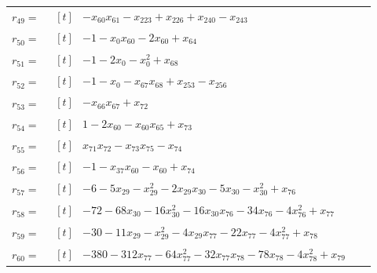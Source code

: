 \begin{longtable}{@{}r p{0.92\linewidth}@{}}
$r_{49}=$ & $\begin{aligned}[t]&-x_{60}x_{61}-x_{223}+x_{226}+x_{240}-x_{243}\end{aligned}$ \\[2pt]
$r_{50}=$ & $\begin{aligned}[t]&-1-x_{0}x_{60}-2x_{60}+x_{64}\end{aligned}$ \\[2pt]
$r_{51}=$ & $\begin{aligned}[t]&-1-2x_{0}-x_{0}^{2}+x_{68}\end{aligned}$ \\[2pt]
$r_{52}=$ & $\begin{aligned}[t]&-1-x_{0}-x_{67}x_{68}+x_{253}-x_{256}\end{aligned}$ \\[2pt]
$r_{53}=$ & $\begin{aligned}[t]&-x_{66}x_{67}+x_{72}\end{aligned}$ \\[2pt]
$r_{54}=$ & $\begin{aligned}[t]&1-2x_{60}-x_{60}x_{65}+x_{73}\end{aligned}$ \\[2pt]
$r_{55}=$ & $\begin{aligned}[t]&x_{71}x_{72}-x_{73}x_{75}-x_{74}\end{aligned}$ \\[2pt]
$r_{56}=$ & $\begin{aligned}[t]&-1-x_{37}x_{60}-x_{60}+x_{74}\end{aligned}$ \\[2pt]
$r_{57}=$ & $\begin{aligned}[t]&-6-5x_{29}-x_{29}^{2}-2x_{29}x_{30}-5x_{30}-x_{30}^{2}+x_{76}\end{aligned}$ \\[2pt]
$r_{58}=$ & $\begin{aligned}[t]&-72-68x_{30}-16x_{30}^{2}-16x_{30}x_{76}-34x_{76}-4x_{76}^{2}+x_{77}\end{aligned}$ \\[2pt]
$r_{59}=$ & $\begin{aligned}[t]&-30-11x_{29}-x_{29}^{2}-4x_{29}x_{77}-22x_{77}-4x_{77}^{2}+x_{78}\end{aligned}$ \\[2pt]
$r_{60}=$ & $\begin{aligned}[t]&-380-312x_{77}-64x_{77}^{2}-32x_{77}x_{78}-78x_{78}-4x_{78}^{2}+x_{79}\end{aligned}$ \\[2pt]

\end{longtable}
